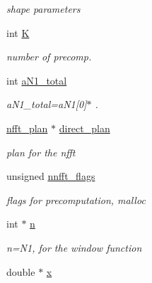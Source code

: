 \begin{CompactItemize}
\begin{CompactList}\small\item\em shape parameters \item\end{CompactList}\item 
int \hyperlink{structnnfft__plan_4ee39bebbff40746c2701ade2e13f1f8}{K}
\begin{CompactList}\small\item\em number of precomp. \item\end{CompactList}\item 
int \hyperlink{structnnfft__plan_cb1a1fa5fdb73d2187e9e9d8e4415921}{aN1\_\-total}
\begin{CompactList}\small\item\em aN1\_\-total=aN1\mbox{[}0\mbox{]}$\ast$ . \item\end{CompactList}\item 
\hypertarget{structnnfft__plan_4dc1f0a5a0ead52ada3ba3b2d7eae75f}{
\hyperlink{structnfft__plan}{nfft\_\-plan} $\ast$ \hyperlink{structnnfft__plan_4dc1f0a5a0ead52ada3ba3b2d7eae75f}{direct\_\-plan}}
\label{structnnfft__plan_4dc1f0a5a0ead52ada3ba3b2d7eae75f}

\begin{CompactList}\small\item\em plan for the nfft \item\end{CompactList}\item 
\hypertarget{structnnfft__plan_5414c3133e2342c971b7f4df711e6e9a}{
unsigned \hyperlink{structnnfft__plan_5414c3133e2342c971b7f4df711e6e9a}{nnfft\_\-flags}}
\label{structnnfft__plan_5414c3133e2342c971b7f4df711e6e9a}

\begin{CompactList}\small\item\em flags for precomputation, malloc \item\end{CompactList}\item 
\hypertarget{structnnfft__plan_6b2de2633dd4347692e96887f98c1020}{
int $\ast$ \hyperlink{structnnfft__plan_6b2de2633dd4347692e96887f98c1020}{n}}
\label{structnnfft__plan_6b2de2633dd4347692e96887f98c1020}

\begin{CompactList}\small\item\em n=N1, for the window function \item\end{CompactList}\item 
\hypertarget{structnnfft__plan_b5b545ac8b82dee7b2d1a3455ecca76d}{
double $\ast$ \hyperlink{structnnfft__plan_b5b545ac8b82dee7b2d1a3455ecca76d}{x}}
\label{structnnfft__plan_b5b545ac8b82dee7b2d1a3455ecca76d}


\end{CompactItemize}
